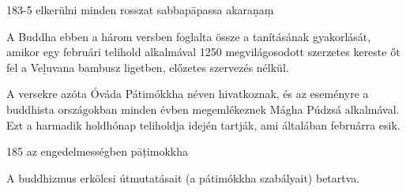 
\begin{notesdescription}

\item[{183-5}
{elkerülni minden rosszat}
{sabbapāpassa akaraṇaṃ}] \hfill\par

A Buddha ebben a három versben foglalta össze a tanításának gyakorlását, amikor egy februári telihold alkalmával 1250 megvilágosodott szerzetes kereste őt fel a Veḷuvana bambusz ligetben, előzetes szervezés nélkül.

A versekre azóta Óváda Pátimókkha néven hivatkoznak, és az eseményre a buddhista országokban minden évben megemlékeznek Mágha Púdzsá alkalmával. Ezt a harmadik holdhónap teliholdja idején tartják, ami általában februárra esik.

\item[{185}
{az engedelmességben}
{pāṭimokkha}] \hfill\par

A buddhizmus erkölcsi útmutatásait (a pátimókkha szabályait) betartva.

\end{notesdescription}

